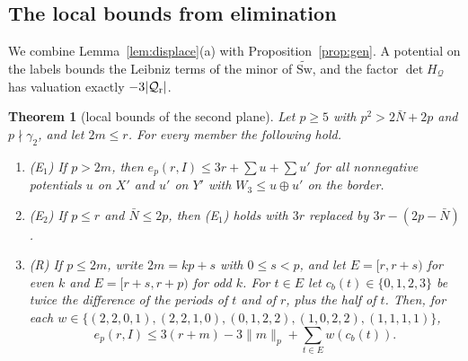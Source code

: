 \documentclass[11pt]{amsart}
\newtheorem{theorem}{Theorem}[section]
\theoremstyle{definition}
\theoremstyle{remark}
\numberwithin{equation}{section}
\begin{document}
\subsection{The local bounds from elimination}
We combine Lemma~\ref{lem:displace}(a) with Proposition~\ref{prop:gen}. A potential on the labels bounds the Leibniz
terms of the minor of $\widetilde{\mathrm{Sw}}$, and the factor $\det H_{\mathcal Q}$ has valuation exactly
$-3|\mathcal Q_{\rm r}|$.

\begin{theorem}[local bounds of the second plane]\label{thm:rows2}
Let $p\ge5$ with $p^2>2\bar N+2p$ and $p\nmid\gamma_2$, and let $2m\le r$. For every member the following hold.
\begin{enumerate}[label=(\roman*),leftmargin=*]
\item (E$_1$) If $p>2m$, then $e_p(r,I)\le3r+\sum u+\sum u'$ for all nonnegative potentials $u$ on $X'$ and $u'$ on $Y'$ with
 $W_3\le u\oplus u'$ on the border.
\item (E$_2$) If $p\le r$ and $\bar N\le2p$, then (E$_1$) holds with $3r$ replaced by $3r-(2p-\bar N)$.
\item (R) If $p\le2m$, write $2m=kp+s$ with $0\le s<p$, and let $E=[r,r+s)$ for even $k$ and
 $E=[r+s,r+p)$ for odd $k$. For $t\in E$ let $c_b(t)\in\{0,1,2,3\}$ be twice the difference of the
 periods of $t$ and of $r$, plus the half of $t$. Then, for each
 $w\in\{(2,2,0,1),(2,2,1,0),(0,1,2,2),(1,0,2,2),(1,1,1,1)\}$,
 \[
 e_p(r,I)\le3(r+m)-3\|m\|_p+\sum_{t\in E}w(c_b(t)).
 \]
\end{enumerate}
\end{theorem}
\end{document}
